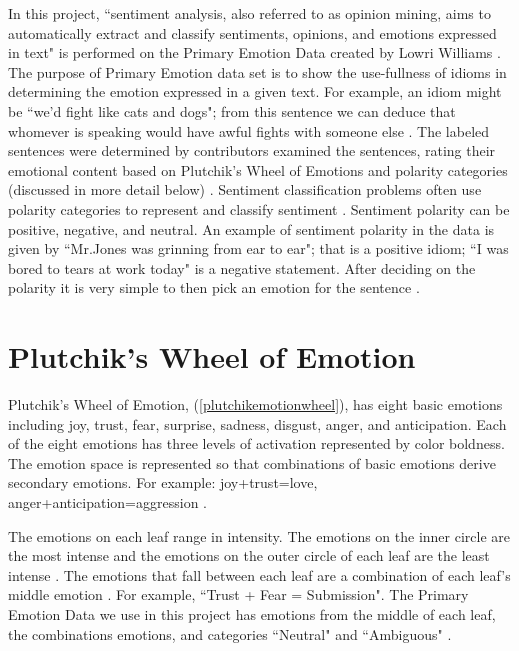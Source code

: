 \documentclass[titlepage,letterpaper]{article}
\begin{document}
In this project, ``sentiment analysis, also referred to as opinion mining, aims to automatically extract and classify sentiments, opinions, and emotions expressed in text" is performed on the Primary Emotion Data created by Lowri Williams \cite{lowriwilliams}. The purpose of Primary Emotion data set is to show the use-fullness of idioms in determining the emotion expressed in a given text. For example, an idiom might be ``we'd fight like cats and dogs"; from this sentence we can deduce that whomever is speaking would have awful fights with someone else \cite{lowriwilliams}. The labeled sentences were determined by contributors examined the sentences, rating their emotional content based on Plutchik's Wheel of Emotions and polarity categories (discussed in more detail below) \cite{lowriwilliams}. Sentiment classification problems often use polarity categories to represent and classify sentiment \cite{lowriwilliams}. Sentiment polarity can be positive, negative, and neutral. An example of sentiment polarity in the data is given by ``Mr.Jones was grinning from ear to ear"; that is a positive idiom; ``I was bored to tears at work today" is a negative statement. After deciding on the polarity it is very simple to then pick an emotion for the sentence \cite{lowriwilliams}. 

\section{Plutchik's Wheel of Emotion}

Plutchik's Wheel of Emotion, (\cref{plutchikemotionwheel}), has eight basic emotions including joy, trust, fear, surprise, sadness, disgust, anger, and anticipation. Each of the eight emotions has three levels of activation represented by color boldness. The emotion space is represented so that combinations of basic emotions derive secondary emotions. For example: joy+trust=love, anger+anticipation=aggression \cite{plutchik2001nature}.

The emotions on each leaf range in intensity. The emotions on the inner circle are the most intense and the emotions on the outer circle of each leaf are the least intense \cite{WheelofEmotion}. The emotions that fall between each leaf are a combination of each leaf's middle emotion \cite{WheelofEmotion}. For example, ``Trust + Fear = Submission". The Primary Emotion Data we use in this project has emotions from the middle of each leaf, the combinations emotions, and categories ``Neutral" and ``Ambiguous" \cite{lowriwilliams}.
\end{document}

